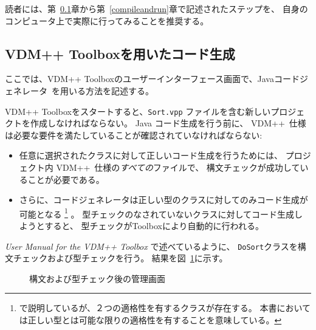 \documentclass[\pformat,11pt]{jarticle}
\newcommand{\ToolboxName}{VDM++ Toolbox}
\newcommand{\Toolbox}{Toolbox}
\newcommand{\langmancite}{\cite{LangManPP-SCSK}}
\newcommand{\VDM}{VDM++}
\newcommand{\cg}{Javaコードジェネレータ}
\begin{document}
読者には、第~\ref{gui}章から第~\ref{compileandrun}章で記述されたステップを、
自身のコンピュータ上で実際に行ってみることを推奨する。

\subsection{VDM++ Toolboxを用いたコード生成}\label{gui}

ここでは、\ToolboxName{}のユーザーインターフェース画面で、\cg\ を用いる方法を記述する。

\ToolboxName{}をスタートすると、{\tt Sort.vpp} ファイルを含む新しいプロジェクトを作成しなければならない。
Java コード生成を行う前に、 \VDM\ 仕様は必要な要件を満たしていることが確認されていなければならない: 

\begin{itemize}
\item
任意に選択されたクラスに対して正しいコード生成を行うためには、
プロジェクト内 \VDM\ 仕様の{\em すべての}ファイルで、
構文チェックが成功していることが必要である。

\item
さらに、コードジェネレータは正しい型のクラスに対してのみコード生成が可能となる
\footnote{\langmancite で説明しているが、２つの適格性を有するクラスが存在する。
本書においては正しい型とは可能な限りの適格性を有することを意味している。} 。
型チェックのなされていないクラスに対してコード生成しようとすると、
型チェックが\Toolbox{}により自動的に行われる。
\end{itemize}

{\em User Manual for the \VDM{} Toolbox} \cite{UserManPP-SCSK}で述べているように、
{\tt DoSort}クラスを構文チェックおよび型チェックを行う。
結果を図~\ref{fig:toolbox}に示す。

\begin{figure}[H]
\begin{center}
\mbox{}
\caption{構文および型チェック後の管理画面}\label{fig:toolbox}
\end{center}
\end{figure}
\end{document}
